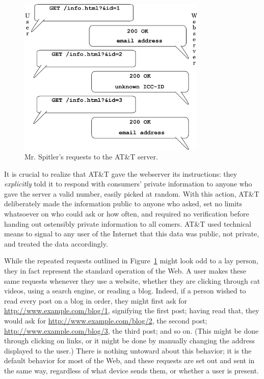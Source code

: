 \documentclass{article}
\begin{document}
	\begin{figure}[ht!]
	  \centering
	  \includegraphics[width=0.8\textwidth]{diagrams/ipad2-2}
	  \caption{Mr. Spitler's requests to the AT\&T server.}
		\label{fig:compipad}
	\end{figure}
	
	It is crucial to realize that AT\&T gave the webserver its instructions: they \emph{explicitly} told it to respond with consumers' private information to anyone who gave the server a valid number, easily picked at random. With this action, AT\&T deliberately made the information public to anyone who asked, set no limits whatsoever on who could ask or how often, and required no verification before handing out ostensibly private information to all comers. AT\&T used technical means to signal to any user of the Internet that this data was public, not private, and treated the data accordingly.
	
	While the repeated requests outlined in Figure~\ref{fig:compipad} might look odd to a lay person, they in fact represent the standard operation of the Web. A user makes these same requests whenever they use a website, whether they are clicking through cat videos, using a search engine, or reading a blog. Indeed, if a person wished to read every post on a blog in order, they might first ask for \url{http://www.example.com/blog/1}, signifying the first post; having read that, they would ask for \url{http://www.example.com/blog/2}, the second post; \url{http://www.example.com/blog/3}, the third post; and so on. (This might be done through clicking on links, or it might be done by manually changing the address displayed to the user.) There is nothing untoward about this behavior; it is the default behavior for most of the Web, and these requests are set out and sent in the same way, regardless of what device sends them, or whether a user is present.
	
\end{document}
